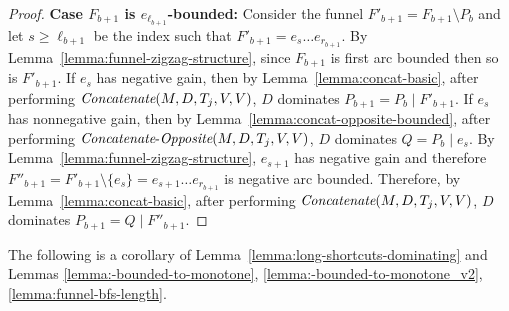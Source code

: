 \documentclass[11pt]{article}
\newcommand{\Concat}{\mbox{{\it Concatenate}}}
\newcommand{\CO}{\mbox{{\it Concatenate}-{\it Opposite}}}
\begin{document}
\begin{proof}
    \textbf{Case $F_{b+1}$ is $e_{\ell_{b+1}}$-bounded:} Consider the funnel $F'_{b+1} = F_{b+1}\setminus P_b$ and let $s\ge \ell_{b+1}$ be the index such that $F'_{b+1} = e_s \ldots e_{r_{b+1}}$. By Lemma~\ref{lemma:funnel-zigzag-structure}, since $F_{b+1}$ is first arc bounded then so is $F'_{b+1}$.
    If $e_{s}$ has negative gain, then by Lemma~\ref{lemma:concat-basic}, after performing $\Concat(M,D,T_j,V,V)$, $D$ dominates $P_{b+1}= P_b \mid F'_{b+1}$.
    If $e_{s}$ has nonnegative gain, then by Lemma~\ref{lemma:concat-opposite-bounded}, after performing $\CO(M,D,T_j,V,V)$, $D$ dominates $Q = P_b \mid e_s$.
    By Lemma~\ref{lemma:funnel-zigzag-structure}, $e_{s+1}$ has negative gain and therefore $F''_{b+1} = F'_{b+1}\setminus \{e_s\} = e_{s+1} \ldots e_{r_{b+1}}$ is negative arc bounded. Therefore, by Lemma~\ref{lemma:concat-basic}, after performing $\Concat(M,D,T_j,V,V)$, $D$ dominates $P_{b+1} = Q \mid F''_{b+1}$.
\end{proof}

The following is a corollary of Lemma~\ref{lemma:long-shortcuts-dominating} and Lemmas \ref{lemma:-bounded-to-monotone}, \ref{lemma:-bounded-to-monotone_v2}, \ref{lemma:funnel-bfs-length}.
\end{document}
